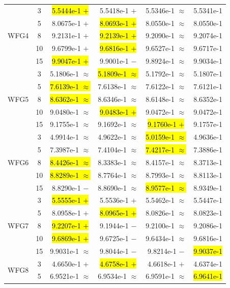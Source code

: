 \documentclass[conference]{IEEEtran}
\begin{document}
\begin{table}[htbp]
\begin{tabular}{cccccc}
  \hline
  \multirow{5}{*}{WFG4}&3&\hl{5.5444e-1 $+$}&5.5418e-1 $+$&5.5346e-1 $\approx$&5.5341e-1\\
  &5&8.0675e-1 $+$&\hl{8.0693e-1 $+$}&8.0550e-1 $\approx$&8.0550e-1\\
  &8&9.2131e-1 $+$&\hl{9.2139e-1 $+$}&9.2090e-1 $\approx$&9.2074e-1\\
  &10&9.6799e-1 $+$&\hl{9.6816e-1 $+$}&9.6527e-1 $\approx$&9.6717e-1\\
  &15&\hl{9.9047e-1 $+$}&9.9001e-1 $-$&9.8924e-1 $\approx$&9.9034e-1\\
  \hline
  \multirow{5}{*}{WFG5}&3&5.1806e-1 $\approx$&\hl{5.1809e-1 $\approx$}&5.1792e-1 $\approx$&5.1807e-1\\
  &5&\hl{7.6139e-1 $\approx$}&7.6138e-1 $\approx$&7.6122e-1 $\approx$&7.6121e-1\\
  &8&\hl{8.6362e-1 $\approx$}&8.6346e-1 $\approx$&8.6148e-1 $\approx$&8.6352e-1\\
  &10&9.0480e-1 $\approx$&\hl{9.0483e-1 $+$}&9.0472e-1 $\approx$&9.0472e-1\\
  &15&9.1755e-1 $\approx$&9.1692e-1 $\approx$&\hl{9.1760e-1 $+$}&9.1757e-1\\
  \hline
  \multirow{5}{*}{WFG6}&3&4.9914e-1 $\approx$&4.9622e-1 $\approx$&\hl{5.0159e-1 $\approx$}&4.9636e-1\\
  &5&7.3987e-1 $\approx$&7.4104e-1 $\approx$&\hl{7.4217e-1 $\approx$}&7.3886e-1\\
  &8&\hl{8.4426e-1 $\approx$}&8.3383e-1 $\approx$&8.4157e-1 $\approx$&8.3713e-1\\
  &10&\hl{8.8289e-1 $\approx$}&8.7764e-1 $\approx$&8.7993e-1 $\approx$&8.8113e-1\\
  &15&8.8290e-1 $-$&8.8690e-1 $\approx$&\hl{8.9577e-1 $\approx$}&8.9349e-1\\
  \hline
  \multirow{5}{*}{WFG7}&3&\hl{5.5555e-1 $+$}&5.5536e-1 $+$&5.5462e-1 $\approx$&5.5447e-1\\
  &5&8.0958e-1 $+$&\hl{8.0965e-1 $+$}&8.0826e-1 $\approx$&8.0823e-1\\
  &8&\hl{9.2207e-1 $+$}&9.1944e-1 $-$&9.2100e-1 $\approx$&9.2086e-1\\
  &10&\hl{9.6869e-1 $+$}&9.6725e-1 $-$&9.6434e-1 $\approx$&9.6816e-1\\
  &15&9.9031e-1 $\approx$&9.8044e-1 $-$&9.8214e-1 $-$&\hl{9.9037e-1}\\
  \hline
  \multirow{5}{*}{WFG8}&3&4.6650e-1 $+$&\hl{4.6758e-1 $+$}&4.6618e-1 $+$&4.6374e-1\\
  &5&6.9521e-1 $\approx$&6.9534e-1 $\approx$&6.9591e-1 $\approx$&\hl{6.9641e-1}\\

\end{tabular}
\end{table}
\end{document}
